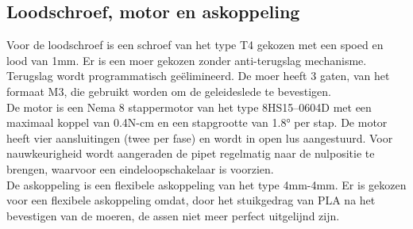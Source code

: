\subsection{Loodschroef, motor en askoppeling}\label{sec: motor}
Voor de loodschroef is een schroef van het type T4 gekozen met een spoed en lood van 1mm. Er is een moer gekozen zonder anti-terugslag mechanisme. Terugslag wordt programmatisch geëlimineerd. De moer heeft 3 gaten, van het formaat M3, die gebruikt worden om de geleideslede te bevestigen.
\\[12pt]De motor is een Nema 8 stappermotor van het type 8HS15--0604D met een maximaal koppel van 0.4N-cm en een stapgrootte van 1.8° per stap. De motor heeft vier aansluitingen (twee per fase) en wordt in open lus aangestuurd. Voor nauwkeurigheid wordt aangeraden de pipet regelmatig naar de nulpositie te brengen, waarvoor een eindeloopschakelaar is voorzien.
\\[12pt]De askoppeling is een flexibele askoppeling van het type 4mm-4mm. Er is gekozen voor een flexibele askoppeling omdat, door het stuikgedrag van PLA na het bevestigen van de moeren, de assen niet meer perfect uitgelijnd zijn.

